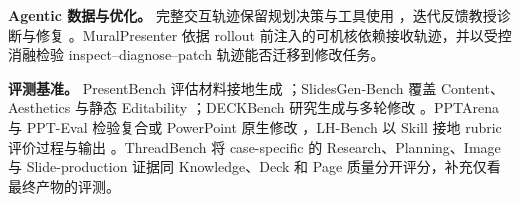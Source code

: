 \textbf{Agentic 数据与优化。} 完整交互轨迹保留规划决策与工具使用 \citep{zeng2023agenttuning,chen2024agentflan}，迭代反馈教授诊断与修复 \citep{madaan2023selfrefine}。MuralPresenter 依据 rollout 前注入的可机核依赖接收轨迹，并以受控消融检验 inspect–diagnose–patch 轨迹能否迁移到修改任务。

\textbf{评测基准。} PresentBench 评估材料接地生成 \citep{chen2026presentbench}；SlidesGen-Bench 覆盖 Content、Aesthetics 与静态 Editability \citep{yang2026slidesgenbench}；DECKBench 研究生成与多轮修改 \citep{jang2026deckbench}。PPTArena 与 PPT-Eval 检验复合或 PowerPoint 原生修改 \citep{ofengenden2025pptarena,gandhi2026ppteval}，LH-Bench 以 Skill 接地 rubric 评价过程与输出 \citep{gupta2026lhbench}。ThreadBench 将 case-specific 的 Research、Planning、Image 与 Slide-production 证据同 Knowledge、Deck 和 Page 质量分开评分，补充仅看最终产物的评测。
